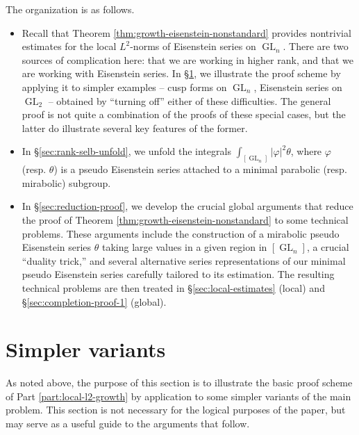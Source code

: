 \documentclass[reqno]{amsart}
\DeclareMathOperator{\GL}{GL}
\theoremstyle{plain} \newtheorem{theorem} {Theorem}
\theoremstyle{definition} \newtheorem{definition} [theorem] {Definition}
\theoremstyle{itplain} %
\numberwithin{equation}{section}
\numberwithin{theorem}{section}
\begin{document}
The organization is as follows.
\begin{itemize}
\item Recall that Theorem \ref{thm:growth-eisenstein-nonstandard} provides nontrivial estimates for the local $L^2$-norms of Eisenstein series on $\GL_n$.  There are two sources of complication here: that we are working in higher rank, and that we are working with Eisenstein series.  In \S\ref{sec:simpler-variants}, we illustrate the proof scheme by applying it to simpler examples -- cusp forms on $\GL_n$, Eisenstein series on $\GL_2$ -- obtained by  ``turning off'' either of these difficulties.  The general proof is not quite a combination of the proofs of these special cases, but the latter do illustrate several key features of the former.
\item 
In \S\ref{sec:rank-selb-unfold}, we unfold the integrals $\int_{[\GL_n]} |\varphi|^2 \theta$, where $\varphi$ (resp. $\theta$) is a pseudo Eisenstein series attached to a minimal parabolic (resp. mirabolic) subgroup.
\item 
In \S\ref{sec:reduction-proof}, we develop the crucial global arguments that reduce the proof of Theorem \ref{thm:growth-eisenstein-nonstandard} to some technical problems.  These arguments include the construction of a mirabolic pseudo Eisenstein series $\theta$ taking large values in a given region in $[\GL_n]$, a crucial ``duality trick,'' and several alternative series representations of our minimal pseudo Eisenstein series carefully tailored to its estimation.  The resulting technical problems are then treated in \S\ref{sec:local-estimates} (local) and \S\ref{sec:completion-proof-1} (global).
\end{itemize}

\section{Simpler variants}\label{sec:simpler-variants}
As noted above, the purpose of this section is to illustrate the basic proof scheme of Part \ref{part:local-l2-growth} by application to some simpler variants of the main problem.  This section is not necessary for the logical purposes of the paper, but may serve as a useful guide to the arguments that follow.
\end{document}
